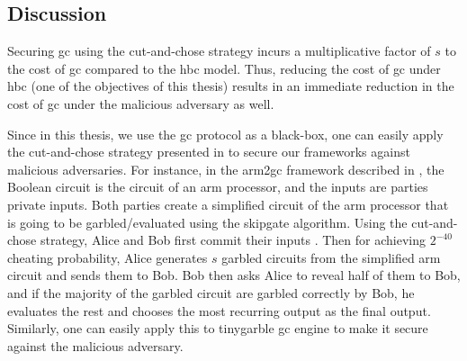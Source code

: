 \subsection{Discussion}\label{sec:related-malicious-dis}
Securing \acrshort{gc} using the cut-and-chose strategy incurs a multiplicative factor of $s$ to the cost of \acrshort{gc} compared to the \acrshort{hbc} model.
Thus, reducing the cost of \acrshort{gc} under \acrshort{hbc} (one of the objectives of this thesis) results in an immediate reduction in the cost of \acrshort{gc} under the malicious adversary as well.

Since in this thesis, we use the \acrshort{gc} protocol as a black-box, one can easily apply the cut-and-chose strategy presented in \cite{lindell2016fast} to secure our frameworks against malicious adversaries.
For instance, in the \gls{arm2gc} framework described in , the Boolean circuit is the circuit of an \gls{arm} processor, and the inputs are parties private inputs.
Both parties create a simplified circuit of the \gls{arm} processor that is going to be garbled/evaluated using the \gls{skipgate} algorithm.
Using the cut-and-chose strategy, Alice and Bob first commit their inputs \cite{lindell2016fast}.
Then for achieving $2^{-40}$ cheating probability, Alice generates $s$ garbled circuits from the simplified \gls{arm} circuit and sends them to Bob.
Bob then asks Alice to reveal half of them to Bob, and if the majority of the garbled circuit are garbled correctly by Bob, he evaluates the rest and chooses the most recurring output as the final output.
Similarly, one can easily apply this to \gls{tinygarble} \acrshort{gc} engine to make it secure against the malicious adversary.

